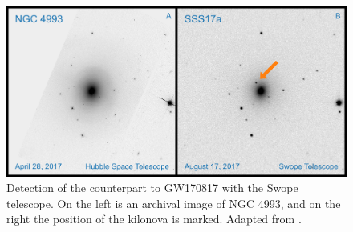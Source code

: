 \begin{colsection}
\begin{colsection}
\begin{figure}[t]
    \begin{center}
        \includegraphics[width=\linewidth]{images/sss17a.pdf}
    \end{center}
    \caption[Detection of the counterpart to GW170817]{
        Detection of the counterpart to GW170817 with the Swope telescope. On the left is an archival image of NGC 4993, and on the right the position of the kilonova is marked. Adapted from \citet{GW170817_Swope}.
        }\label{fig:sss17a}
\end{figure}


\end{colsection}
\end{colsection}
